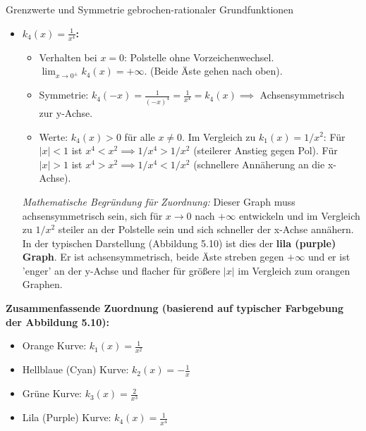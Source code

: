 \begin{loesungsumgebung}{Grenzwerte und Symmetrie gebrochen-rationaler Grundfunktionen}
\begin{enumerate}[label=(\alph*)]
\begin{itemize}
        \item \textbf{$k_4(x) = \frac{1}{x^4}$:}
        \begin{itemize}
            \item Verhalten bei $x=0$: Polstelle ohne Vorzeichenwechsel. $\lim_{x \to 0^\pm} k_4(x) = +\infty$. (Beide Äste gehen nach oben).
            \item Symmetrie: $k_4(-x) = \frac{1}{(-x)^4} = \frac{1}{x^4} = k_4(x) \implies$ Achsensymmetrisch zur y-Achse.
            \item Werte: $k_4(x) > 0$ für alle $x \neq 0$. Im Vergleich zu $k_1(x)=1/x^2$: Für $|x|<1$ ist $x^4 < x^2 \implies 1/x^4 > 1/x^2$ (steilerer Anstieg gegen Pol). Für $|x|>1$ ist $x^4 > x^2 \implies 1/x^4 < 1/x^2$ (schnellere Annäherung an die x-Achse).
        \end{itemize}
        \textit{Mathematische Begründung für Zuordnung:} Dieser Graph muss achsensymmetrisch sein, sich für $x \to 0$ nach $+\infty$ entwickeln und im Vergleich zu $1/x^2$ steiler an der Polstelle sein und sich schneller der x-Achse annähern.
        In der typischen Darstellung (Abbildung 5.10) ist dies der \textbf{lila (purple) Graph}. Er ist achsensymmetrisch, beide Äste streben gegen $+\infty$ und er ist 'enger' an der y-Achse und flacher für größere $|x|$ im Vergleich zum orangen Graphen.
    \end{itemize}
    \textbf{Zusammenfassende Zuordnung (basierend auf typischer Farbgebung der Abbildung 5.10):}
    \begin{itemize}
        \item Orange Kurve: $k_1(x) = \frac{1}{x^2}$
        \item Hellblaue (Cyan) Kurve: $k_2(x) = -\frac{1}{x}$
        \item Grüne Kurve: $k_3(x) = \frac{2}{x^3}$
        \item Lila (Purple) Kurve: $k_4(x) = \frac{1}{x^4}$
    \end{itemize}
\end{enumerate}

\end{loesungsumgebung}


